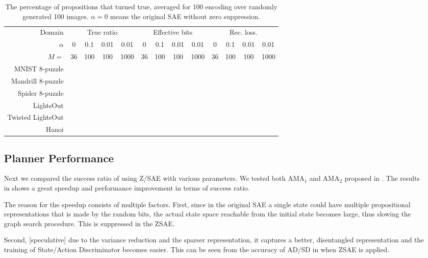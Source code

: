 \begin{table}
 \begin{tabular}{|r|*{12}{c|}}
  Domain            & \multicolumn{4}{|c|}{True ratio} & \multicolumn{4}{|c|}{Effective bits} & \multicolumn{4}{|c|}{Rec. loss.} \\
  $\alpha$          & 0  & 0.1 & 0.01 & 0.01 & 0  & 0.1 & 0.01 & 0.01 & 0  & 0.1 & 0.01 & 0.01 \\
  $M=$              & 36 & 100 & 100  & 1000 & 36 & 100 & 100  & 1000 & 36 & 100 & 100  & 1000  \\
  MNIST    8-puzzle & & & & & & & & & & & & \\
  Mandrill 8-puzzle & & & & & & & & & & & & \\
  Spider   8-puzzle & & & & & & & & & & & & \\
  LightsOut         & & & & & & & & & & & & \\
  Twisted LightsOut & & & & & & & & & & & & \\
  Hanoi             & & & & & & & & & & & & \\
 \end{tabular}
 \caption{The percentage of propositions that turned true, averaged for
 100 encoding over randomly generated 100 images.
 $\alpha=0$ means the original SAE without zero suppression.
 }
 \label{tab:true-ratio}
\end{table}

\subsection{Planner Performance}

Next we compared the success ratio of \latentplanner using Z/SAE with various parameters.
We tested both AMA$_1$ and AMA$_2$ proposed in \cite{Asai2018}.
The results in  shows a great speedup and performance improvement
in terms of success ratio.

The reason for the speedup consists of multiple factors.
First, since in the original SAE a single state could have multiple propositional representations
that is made by the random bits, the actual state space reachable from the initial state becomes large,
thus slowing the graph search procedure. This is suppressed in the ZSAE.

Second, [speculative] due to the variance reduction and the sparser representation,
it captures a better, disentangled representation and 
the training of State/Action Discriminator becomes easier.
This can be seen from the accuracy of AD/SD in  when ZSAE is applied.

